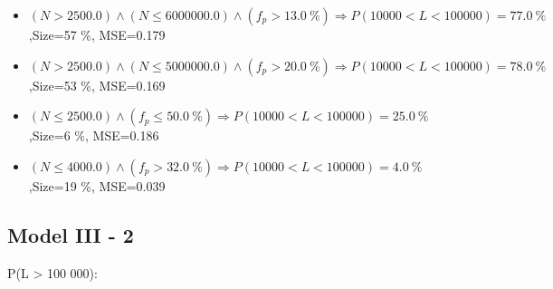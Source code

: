 \documentclass[numbered]{CSL}
\begin{document}
\begin{itemize}
\item $(N > 2500.0) \land (N \leq 6000000.0) \land (f_p > 13.0~\%) \Rightarrow P(10 000 < L < 100 000) = 77.0~\%$,\hfill Size=57 \%, MSE=0.179
\item $(N > 2500.0) \land (N \leq 5000000.0) \land (f_p > 20.0~\%) \Rightarrow P(10 000 < L < 100 000) = 78.0~\%$,\hfill Size=53 \%, MSE=0.169
\item $(N \leq 2500.0) \land (f_p \leq 50.0~\%) \Rightarrow P(10 000 < L < 100 000) = 25.0~\%$,\hfill Size=6 \%, MSE=0.186
\item $(N \leq 4000.0) \land (f_p > 32.0~\%) \Rightarrow P(10 000 < L < 100 000) = 4.0~\%$,\hfill Size=19 \%, MSE=0.039
\end{itemize}

\subsection{Model III - 2}
P(L > 100 000):
\end{document}
